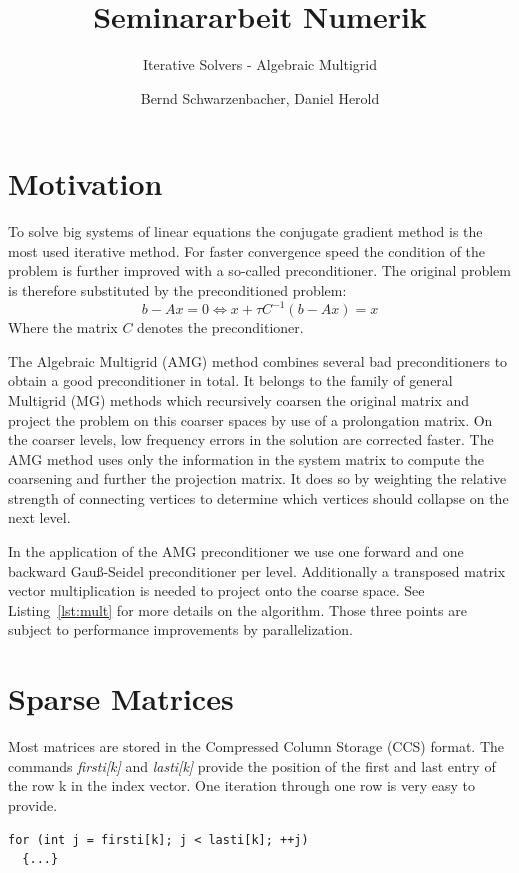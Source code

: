 \documentclass[a4paper,11pt]{scrartcl}
\title{Seminararbeit Numerik}
\subtitle{Iterative Solvers - Algebraic Multigrid}
\author{Bernd Schwarzenbacher, Daniel Herold}
\begin{document}
\maketitle
\tableofcontents
\pagebreak

\section{Motivation} \label{section:motiv}
To solve big systems of linear equations the conjugate gradient method is the
most used iterative method. For faster convergence speed the condition of the
problem is further improved with a so-called preconditioner.
The original problem is therefore substituted by the preconditioned problem:
$$b-Ax = 0 \iff x + \tau C^{-1} (b-Ax) = x$$
Where the matrix $C$ denotes the preconditioner.

The Algebraic Multigrid (AMG) method combines several bad preconditioners to
obtain a good preconditioner in total. It belongs to the family of general
Multigrid (MG) methods which recursively coarsen the original matrix and
project the problem on this coarser spaces by use of a prolongation matrix.
On the coarser levels, low frequency errors in the solution are corrected
faster. The AMG method uses only the information in the system matrix to
compute the coarsening and further the projection matrix. It does so by
weighting the relative strength of connecting vertices to determine which
vertices should collapse on the next level.
\cite{numerik} \cite{numpde}

In the application of the AMG preconditioner we use one forward and one
backward Gauß-Seidel preconditioner per level. Additionally a
transposed matrix vector multiplication is needed to project onto the
coarse space. See Listing~\ref{lst:mult} for more details on the algorithm.
Those three points are subject to performance improvements by parallelization.

\section{Sparse Matrices}
Most matrices are stored in the Compressed Column Storage (CCS) format.
The commands {\em firsti[k]}\/ and {\em lasti[k]}\/ provide the position of the
first and last entry of the row k in the index vector. One
iteration through one row is very easy to provide.

\begin{lstlisting}
for (int j = firsti[k]; j < lasti[k]; ++j)
  {...}
\end{lstlisting}
\end{document}
